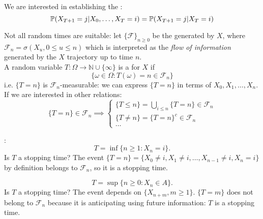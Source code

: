 \documentclass{article}
\begin{document}
	\begin{definition}{}
		We are interested in establishing the :
		\begin{equation}
			\mathbb{P}(X_{T+1}=j|X_0,\ldots,X_T=i)=\mathbb{P}(X_{T+1}=j|X_T=i)
		\end{equation}
	\end{definition}
	Not all random times are suitable: let $\{\mathscr{F}\}_{n\geqslant 0}$ be the  generated by $X$, where $\mathscr{F}_n=\sigma(X_u, 0\leqslant u \leqslant n)$ which is interpreted as the \textit{flow of information} generated by the $X$ trajectory up to time $n$.\\ A random variable $T:\Omega\rightarrow\mathbb{N}\cup\{\infty\}$ is a  for $X$ if 
	\[
	\{\omega\in\Omega :T(\omega)=n\in\mathscr{F}_n\}
	\]
	i.e. $\{T=n\}$ is $\mathscr{F}_n$-measurable: we can express $\{T=n\}$ in terms of $X_0,X_1,\ldots,X_n$. If we are interested in other relations:
	\[
	\{T=n\}\in\mathscr{F}_n\implies\begin{cases}
		\{T\leqslant n\}=\bigcup_{i \leqslant n}\{T=n\}\in\mathscr{F}_n\\
		\{T\neq n\}=\{T=n\}^c\in\mathscr{F}_n\\
		\ldots
	\end{cases}
	\]
	
	\begin{example}{:}
		\[
		T=\inf\{n\geqslant 1: X_n=i\}.
		\]
		Is $T$ a stopping time? The event $\{T=n\}=\{X_0 \neq i, X_1 \neq i, \ldots, X_{n-1}\neq i, X_n=i\}$ by definition belongs to $\mathscr{F}_n$, so it is a stopping time.
	\end{example}
	\begin{example}{}
		\[
		T=\sup\{n\geqslant 0: X_n\in A\}.
		\]
		Is $T$ a stopping time? The event depends on $\{X_{n+m},m\geqslant 1\}$. $\{T=m\}$ does not belong to $\mathscr{F}_n$ because it is anticipating using future information: $T$ is  a stopping time.
	\end{example}
	
\end{document}
